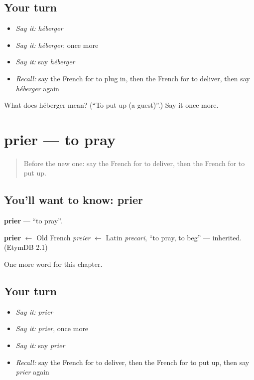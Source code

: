 \subsection*{Your turn}
\begin{itemize}
\raggedright
  \item \emph{Say it:} \emph{héberger}
  \item \emph{Say it:} \emph{héberger}, once more
  \item \emph{Say it:} say \emph{héberger}
  \item \emph{Recall:} say the French for to plug in, then the French for to deliver, then say \emph{héberger} again
\end{itemize}

\begin{tcolorbox}[breakable,colback=teal!4,colframe=teal!35!black,title={Before you move on}]
What does héberger mean? (\textquotedblleft{}To put up (a guest)\textquotedblright{}.) Say it once more.
\end{tcolorbox}
\section[prier]{prier — to pray}

\label{lesson:FR-C151-prier}



\begin{quote}
Before the new one: say the French for to deliver, then the French for to put up.
\end{quote}

\subsection*{You'll want to know: prier}
\textbf{prier} — \textquotedblleft{}to pray\textquotedblright{}.

\begin{cousinweb}
\textbf{prier} $\leftarrow$ Old French \emph{preier} $\leftarrow$ Latin \emph{precari}, \textquotedblleft{}to pray, to beg\textquotedblright{} — inherited. (EtymDB 2.1)
\end{cousinweb}

\begin{grammarlens}[title={What you've built}]
One more word for this chapter.
\end{grammarlens}

\subsection*{Your turn}
\begin{itemize}
\raggedright
  \item \emph{Say it:} \emph{prier}
  \item \emph{Say it:} \emph{prier}, once more
  \item \emph{Say it:} say \emph{prier}
  \item \emph{Recall:} say the French for to deliver, then the French for to put up, then say \emph{prier} again
\end{itemize}

